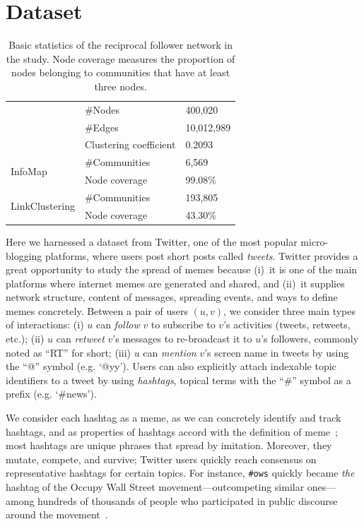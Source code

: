 \documentclass[letterpaper]{article}
\begin{document}
\section{Dataset}

\begin{table}
\caption{Basic statistics of the reciprocal follower network in the study. Node coverage measures the proportion of nodes belonging to communities that have at least three nodes.}
	\centering
	\begin{tabular}{ p{2cm} l >{\hfill}p{2cm}}
	\hline
	& \#Nodes  &  400,020 \\
	& \#Edges  & 10,012,989 \\
	& Clustering coefficient &  0.2093 \\
	\hline
	\multirow{2}{*}{InfoMap} & \#Communities &  6,569 \\
	& Node coverage & 99.08\% \\
	\multirow{2}{*}{LinkClustering} & \#Communities & 193,805\\
	& Node coverage & 43.30\% \\
	\hline
	\end{tabular}
\label{table:dataset}
\end{table}

Here we harnessed a dataset from Twitter, one of the most popular micro-blogging
platforms, where users post short posts called \emph{tweets}. Twitter provides
a great opportunity to study the spread of memes because (i)~it is one of the main
platforms where internet memes are generated and shared, and (ii)~it
supplies network structure, content of messages, spreading events, and
ways to define memes concretely. 
Between a pair of users $(u,v)$, we consider three main types of interactions:
(i) $u$ can \emph{follow} $v$ to subscribe to $v$'s activities (tweets, retweets, etc.); (ii) $u$ can
\emph{retweet} $v$'s messages to re-broadcast it to $u$'s followers, commonly
noted as ``RT'' for short; (iii) $u$ can \emph{mention} $v$'s screen name in tweets by
using the ``@'' symbol (e.g. `@yy').  Users can also explicitly attach
indexable topic identifiers to a tweet by using \emph{hashtags}, topical terms
with the ``\#'' symbol as a prefix (e.g. `\#news').
 
 
We consider each hashtag as a meme, as we can concretely identify and track
hashtags, and as properties of hashtags accord with the definition of
meme~\cite{meme}; most hashtags are unique phrases that spread by imitation.
Moreover, they mutate, compete, and survive; Twitter users quickly reach
consensus on representative hashtags for certain topics.  For instance,
\texttt{\#ows} quickly became \emph{the} hashtag of the Occupy Wall Street
movement---outcompeting similar ones---among hundreds of thousands of people
who participated in public discourse around the movement~\cite{conover2013ows}.  
\end{document}
